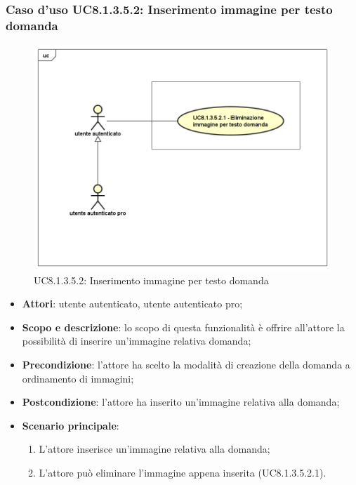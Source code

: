 \subsubsection{Caso d’uso UC8.1.3.5.2: Inserimento immagine per testo domanda}
\label{UC8.1.3.5.2}
\begin{figure}[h]
	\centering
	\includegraphics[scale=0.45,keepaspectratio]{UML/UC8_1_3_5_2.png}
	\caption{UC8.1.3.5.2: Inserimento immagine per testo domanda}
\end{figure}
\FloatBarrier
\begin{itemize}
	\item\textbf{Attori}: utente autenticato, utente autenticato pro;
	\item\textbf{Scopo e descrizione}: lo scopo di questa funzionalità è offrire all'attore  la possibilità di inserire un'immagine relativa domanda;
	\item\textbf{Precondizione}: l'attore ha scelto la modalità di creazione della domanda a ordinamento di immagini; 
	\item \textbf{Postcondizione}: l'attore ha inserito un'immagine relativa alla domanda;
	\item\textbf{Scenario principale}: 
		\begin{enumerate}
			\item L'attore inserisce un'immagine relativa alla domanda;
			\item L'attore può eliminare l'immagine appena inserita (UC8.1.3.5.2.1).
		\end{enumerate}

\end{itemize}

